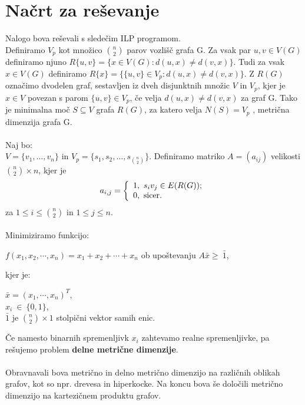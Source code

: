 \documentclass[a4paper]{report}
\begin{document}
\section*{Načrt za reševanje}
Nalogo bova reševali s sledečim ILP programom.\\

Definiramo $V_p$ kot množico $\binom{n}{2}$ parov vozlišč grafa G. Za vsak par $u,v \in V(G)$ definiramo njuno $R\{u,v\}=\{x \in V(G): d(u,x)\neq d(v,x)\}.$ Tudi za vsak $x \in V(G)$ definiramo $R\{x\}= \{\{u,v\}\in V_p: d(u,x)\neq d(v,x)\}$. Z $R(G)$ označimo dvodelen graf, sestavljen iz dveh disjunktnih množic $V$ in $V_p$, kjer je $x \in V$ povezan s parom $\{u,v\} \in V_p$, če velja $d(u,x)\neq d(v,x)$ za graf G.  Tako je minimalna moč $S \subseteq V$ grafa $R(G)$, za katero velja $N(S) = V_p$  , metrična dimenzija grafa G. \\\\
Naj bo:\\
$V = \{v_1,\dots, v_n\}$ in $V_p = \{s_1,s_2,\dots,s_{\binom{n}{2}} \} $. Definiramo matriko  $ A = (a_{ij})$  velikosti $\binom{n}{2} \times n$, kjer je\[ a_{i,j}  =  \left \{ \begin{array}{l}1,\ \mbox{$ s_i v_j \in E(R(G))$}; \\0,\ \mbox{sicer}. \end{array} \right. \]
za $1\le i\le \binom{n}{2}$ in $1\le  j\le n$.\\
\pagebreak
\\
 Minimiziramo funkcijo: \begin{center}$f(x_1,x_2, \cdots,x_n)=x_1+x_2+\cdots+x_n$ 
ob upoštevanju $A\bar{x}\ge\ \bar{1}$,\end{center} 
kjer je: \begin{center}
 $\bar{x}=(x_1,\cdots,x_n)^T$,\\
$x_i\ \in\ \{0,1 \}$,\\
$\bar{1}$ je $\binom{n}{2}\times 1$  stolpični vektor samih enic. \end{center}
Če namesto binarnih spremenljivk $x_i$ zahtevamo realne spremenljivke, pa rešujemo problem \textbf{delne metrične dimenzije}. \\\\
Obravnavali bova metrično in delno metrično dimenzijo na različnih oblikah grafov, kot so npr. drevesa in hiperkocke. Na koncu bova še določili metrično dimenzijo na kartezičnem produktu grafov. \\
\end{document}
